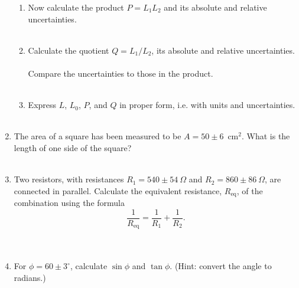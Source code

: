 \begin{enumerate}
\begin{enumerate}
\item Now calculate the product $P = L_1 L_2$ and its absolute and relative
uncertainties. \\
\vspace*{2cm} \\

\item Calculate the quotient $Q=L_1/L_2$, its absolute and relative
uncertainties. \\
\vspace*{2cm} \\
\noindent Compare the uncertainties to those in the product. \\
\vspace*{2cm} \\

\item Express $L$, $L_0$, $P$, and $Q$ in proper form, i.e. with units and 
uncertainties.  \\
\vspace*{3cm} \\
\end{enumerate}

\item The area of a square has been measured to be $A=50\pm 6$~cm$^2$. What is
the length of one side of the square?  \\
\vspace*{2cm} \\

\item Two resistors, with resistances $R_1=540\pm 54~\Omega$ and 
$R_2=860\pm 86~\Omega$, are connected in parallel. Calculate the equivalent 
resistance, $R_{\mbox{eq}}$, of the combination using the formula 
$$ \frac{1}{R_{\mbox{eq}}} = \frac{1}{R_1} + \frac{1}{R_2}.$$ \\
\vspace*{10cm} \\

\item For $\phi=60\pm 3^\circ$, calculate $\sin\phi$ and $\tan\phi$.
(Hint: convert the angle to radians.) \\
\vspace*{3cm} \\


\end{enumerate}
